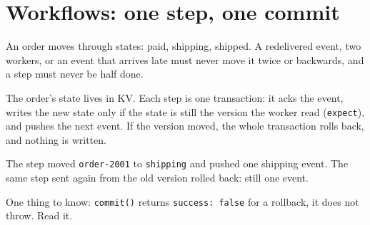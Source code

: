 %

\section{Workflows: one step, one commit}

An order moves through states: paid, shipping, shipped. A redelivered event, two workers, or an
event that arrives late must never move it twice or backwards, and a step must never be half done.

The order's state lives in KV. Each step is one transaction: it acks the event, writes the new
state only if the state is still the version the worker read (\texttt{expect}), and pushes the next
event. If the version moved, the whole transaction rolls back, and nothing is written.



The step moved \texttt{order-2001} to \texttt{shipping} and pushed one shipping event. The same
step sent again from the old version rolled back: still one event.


One thing to know: \texttt{commit()} returns \texttt{success: false} for a rollback, it does not
throw. Read it.
